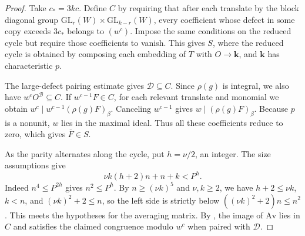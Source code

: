 \begin{proof}
Take $c_\ast=3kc$. Define $C$ by requiring that after each translate by the block diagonal group $\mathrm{GL}_r(W)\times\mathrm{GL}_{k-r}(W)$, every coefficient whose defect in some copy exceeds $3c_\ast$ belongs to $(w^c)$. Impose the same conditions on the reduced cycle but require those coefficients to vanish. This gives $S$, where the reduced cycle is obtained by composing each embedding of $T$ with $O\to\mathbf k$, and $\mathbf k$ has characteristic $p$.

The large-defect pairing estimate gives $\mathcal D\subseteq C$. Since $\rho(g)$ is integral, we also have $w^cO^{\mathcal B}\subseteq C$. If $w^{c-1}F\in C$, for each relevant translate and monomial we obtain $w^c\mid w^{c-1}(\rho(g)F)_\beta$. Canceling $w^{c-1}$ gives $w\mid(\rho(g)F)_\beta$. Because $p$ is a nonunit, $w$ lies in the maximal ideal. Thus all these coefficients reduce to zero, which gives $\overline F\in S$.

As the parity alternates along the cycle, put $h=\nu/2$, an integer. The size assumptions give
\[
 \nu k(h+2)n+n+k<P^h.
\]
Indeed $n^4\le P^{2h}$ gives $n^2\le P^h$. By $n\ge(\nu k)^5$ and $\nu,k\ge2$, we have $h+2\le\nu k$, $k<n$, and $(\nu k)^2+2\le n$, so the left side is strictly below $((\nu k)^2+2)n\le n^2$. This meets the hypotheses for the averaging matrix. By , the image of $\mathrm{Av}$ lies in $C$ and satisfies the claimed congruence modulo $w^c$ when paired with $\mathcal D$.


\end{proof}
